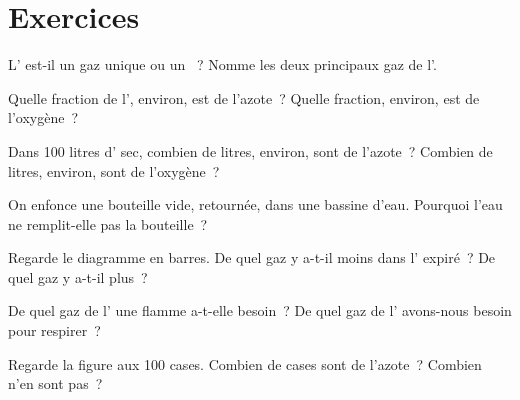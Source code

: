 \section{Exercices}

\begin{exercise}[$\star$]\label{exo:g4:air-a-mixture-of-gases:1}
L' est-il un gaz unique ou un ~? Nomme les deux principaux gaz
de l'.
\end{exercise}

\begin{exercise}[$\star$]\label{exo:g4:air-a-mixture-of-gases:2}
Quelle fraction de l', environ, est de l'azote~? Quelle fraction,
environ, est de l'oxygène~?
\end{exercise}

\begin{exercise}[$\star$]\label{exo:g4:air-a-mixture-of-gases:3}
Dans 100 litres d' sec, combien de litres, environ, sont de
l'azote~? Combien de litres, environ, sont de l'oxygène~?
\end{exercise}

\begin{exercise}[$\star$]\label{exo:g4:air-a-mixture-of-gases:4}
On enfonce une bouteille vide, retournée, dans une bassine d'eau.
Pourquoi l'eau ne remplit-elle pas la bouteille~?
\end{exercise}

\begin{exercise}[$\star$]\label{exo:g4:air-a-mixture-of-gases:5}
Regarde le diagramme en barres. De quel gaz y a-t-il moins dans l'
expiré~? De quel gaz y a-t-il plus~?
\end{exercise}

\begin{exercise}[$\star$]\label{exo:g4:air-a-mixture-of-gases:6}
De quel gaz de l' une flamme a-t-elle besoin~? De quel gaz de l'
avons-nous besoin pour respirer~?
\end{exercise}

\begin{exercise}[$\star$]\label{exo:g4:air-a-mixture-of-gases:7}
Regarde la figure aux 100 cases. Combien de cases sont de l'azote~?
Combien n'en sont pas~?
\end{exercise}


